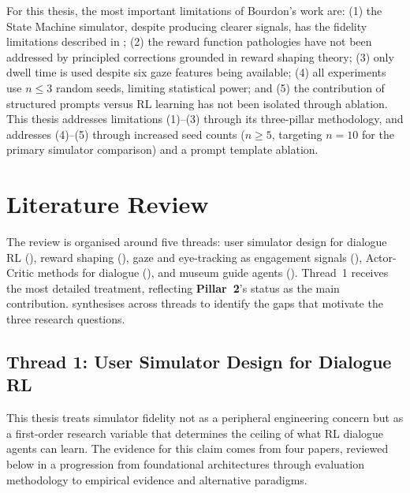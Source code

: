 \documentclass[a4paper, 11pt]{article}
\newcommand{\pillar}[1]{\textbf{Pillar~#1}}
\begin{document}
For this thesis, the most important limitations of Bourdon's work are: (1) the State Machine simulator, despite producing clearer signals, has the fidelity limitations described in ; (2) the reward function pathologies have not been addressed by principled corrections grounded in reward shaping theory; (3) only dwell time is used despite six gaze features being available; (4) all experiments use $n \leq 3$ random seeds, limiting statistical power; and (5) the contribution of structured prompts versus RL learning has not been isolated through ablation. This thesis addresses limitations (1)--(3) through its three-pillar methodology, and addresses (4)--(5) through increased seed counts ($n \geq 5$, targeting $n = 10$ for the primary simulator comparison) and a prompt template ablation.


\section{Literature Review}
\label{sec:literature_review}

The review is organised around five threads: user simulator design for dialogue RL (), reward shaping (), gaze and eye-tracking as engagement signals (), Actor-Critic methods for dialogue (), and museum guide agents (). Thread~1 receives the most detailed treatment, reflecting \pillar{2}'s status as the main contribution.  synthesises across threads to identify the gaps that motivate the three research questions.

\subsection{Thread 1: User Simulator Design for Dialogue RL}
\label{sec:lit_simulators}

This thesis treats simulator fidelity not as a peripheral engineering concern but as a first-order research variable that determines the ceiling of what RL dialogue agents can learn. The evidence for this claim comes from four papers, reviewed below in a progression from foundational architectures through evaluation methodology to empirical evidence and alternative paradigms.
\end{document}

